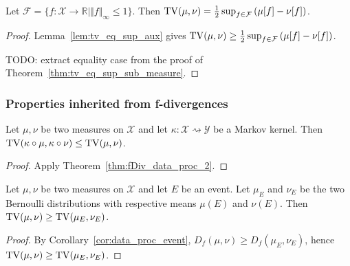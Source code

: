 \begin{theorem}
  \label{thm:tv_eq_sup_sub_integral}
  Let $\mathcal F = \{f : \mathcal X \to \mathbb{R} \mid \Vert f \Vert_\infty \le 1\}$.
  Then $\operatorname{TV}(\mu, \nu) = \frac{1}{2} \sup_{f \in \mathcal F} \left( \mu[f] - \nu[f] \right)$.
\end{theorem}

\begin{proof}
Lemma~\ref{lem:tv_eq_sup_aux} gives $\operatorname{TV}(\mu, \nu) \ge \frac{1}{2} \sup_{f \in \mathcal F} \left( \mu[f] - \nu[f] \right)$.

TODO: extract equality case from the proof of Theorem~\ref{thm:tv_eq_sup_sub_measure}.
\end{proof}

\subsubsection{Properties inherited from f-divergences}

\begin{theorem}
  \label{thm:tv_data_proc}
  Let $\mu, \nu$ be two measures on $\mathcal X$ and let $\kappa : \mathcal X \rightsquigarrow \mathcal Y$ be a Markov kernel.
  Then $\operatorname{TV}(\kappa \circ \mu, \kappa \circ \nu) \le \operatorname{TV}(\mu, \nu)$.
\end{theorem}

\begin{proof}
Apply Theorem~\ref{thm:fDiv_data_proc_2}.
\end{proof}

\begin{lemma}
  \label{lem:tv_data_proc_event}
  Let $\mu, \nu$ be two measures on $\mathcal X$ and let $E$ be an event. Let $\mu_E$ and $\nu_E$ be the two Bernoulli distributions with respective means $\mu(E)$ and $\nu(E)$.
  Then $\operatorname{TV}(\mu, \nu) \ge \operatorname{TV}(\mu_E, \nu_E)$.
\end{lemma}

\begin{proof}
By Corollary~\ref{cor:data_proc_event}, $D_f(\mu, \nu) \ge D_f(\mu_E, \nu_E)$, hence $\operatorname{TV}(\mu, \nu) \ge \operatorname{TV}(\mu_E, \nu_E)$.
\end{proof}

